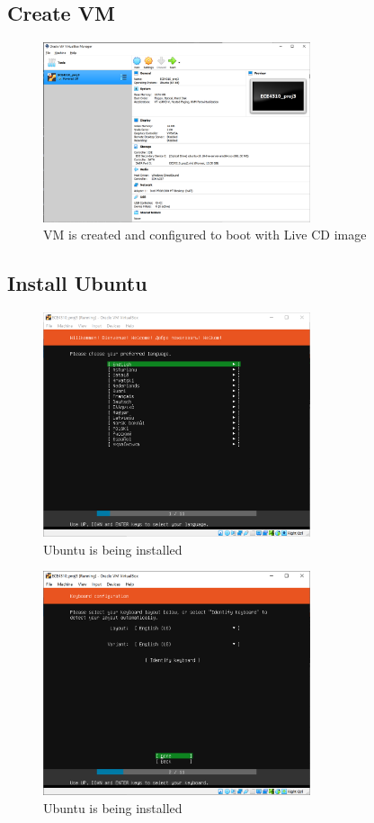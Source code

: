 \documentclass{article}
\begin{document}
\subsection{Create VM}
\begin{figure}[H]
  \caption{VM is created and configured to boot with Live CD image}
  \centering
  \includegraphics[width=0.7\textwidth]{ECE4310_Proj3_1_configured.png}
\end{figure}

\subsection{Install Ubuntu}
\begin{figure}[H]
  \caption{Ubuntu is being installed}
  \centering
  \includegraphics[width=0.7\textwidth]{ECE4310_Proj3_1_installing_1.png}
\end{figure}

\begin{figure}[H]
  \caption{Ubuntu is being installed}
  \centering
  \includegraphics[width=0.7\textwidth]{ECE4310_Proj3_1_installing_2.png}
\end{figure}
\end{document}
